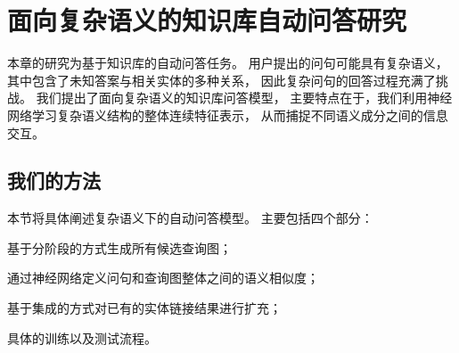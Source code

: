 
\chapter{面向复杂语义的知识库自动问答研究}
\label{chap:compqa}

本章的研究为基于知识库的自动问答任务。
用户提出的问句可能具有复杂语义，其中包含了未知答案与相关实体的多种关系，
因此复杂问句的回答过程充满了挑战。
我们提出了面向复杂语义的知识库问答模型，
主要特点在于，我们利用神经网络学习复杂语义结构的整体连续特征表示，
从而捕捉不同语义成分之间的信息交互。







\section{我们的方法}%
\label{sec:compqa-approach}

本节将具体阐述复杂语义下的自动问答模型。
主要包括四个部分：
\begin{enumerate*}
\item{基于分阶段的方式生成所有候选查询图；}
\item{通过神经网络定义问句和查询图整体之间的语义相似度；}
\item{基于集成的方式对已有的实体链接结果进行扩充；}
\item{具体的训练以及测试流程。}%
\end{enumerate*}

